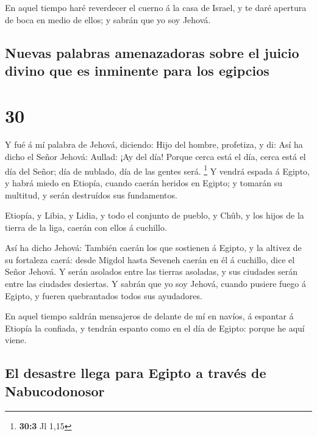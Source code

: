  En aquel tiempo haré reverdecer el cuerno á la casa de
Israel, y te daré apertura de boca en medio de ellos; y sabrán que yo
soy Jehová.

\hypertarget{nuevas-palabras-amenazadoras-sobre-el-juicio-divino-que-es-inminente-para-los-egipcios}{%
\subsection{Nuevas palabras amenazadoras sobre el juicio divino que es
inminente para los
egipcios}\label{nuevas-palabras-amenazadoras-sobre-el-juicio-divino-que-es-inminente-para-los-egipcios}}

\hypertarget{section-29}{%
\section{30}\label{section-29}}

 Y fué á mí palabra de Jehová, diciendo:  Hijo
del hombre, profetiza, y di: Así ha dicho el Señor Jehová: Aullad: ¡Ay
del día!  Porque cerca está el día, cerca está el día del
Señor; día de nublado, día de las gentes será. \footnote{\textbf{30:3}
  Jl 1,15}  Y vendrá espada á Egipto, y habrá miedo en
Etiopía, cuando caerán heridos en Egipto; y tomarán su multitud, y serán
destruídos sus fundamentos.

 Etiopía, y Libia, y Lidia, y todo el conjunto de pueblo, y
Chûb, y los hijos de la tierra de la liga, caerán con ellos á cuchillo.

 Así ha dicho Jehová: También caerán los que sostienen á
Egipto, y la altivez de su fortaleza caerá: desde Migdol hasta Seveneh
caerán en él á cuchillo, dice el Señor Jehová.  Y serán
asolados entre las tierras asoladas, y sus ciudades serán entre las
ciudades desiertas.  Y sabrán que yo soy Jehová, cuando
pusiere fuego á Egipto, y fueren quebrantados todos sus ayudadores.

 En aquel tiempo saldrán mensajeros de delante de mí en
navíos, á espantar á Etiopía la confiada, y tendrán espanto como en el
día de Egipto: porque he aquí viene.

\hypertarget{el-desastre-llega-para-egipto-a-travuxe9s-de-nabucodonosor}{%
\subsection{El desastre llega para Egipto a través de
Nabucodonosor}\label{el-desastre-llega-para-egipto-a-travuxe9s-de-nabucodonosor}}


